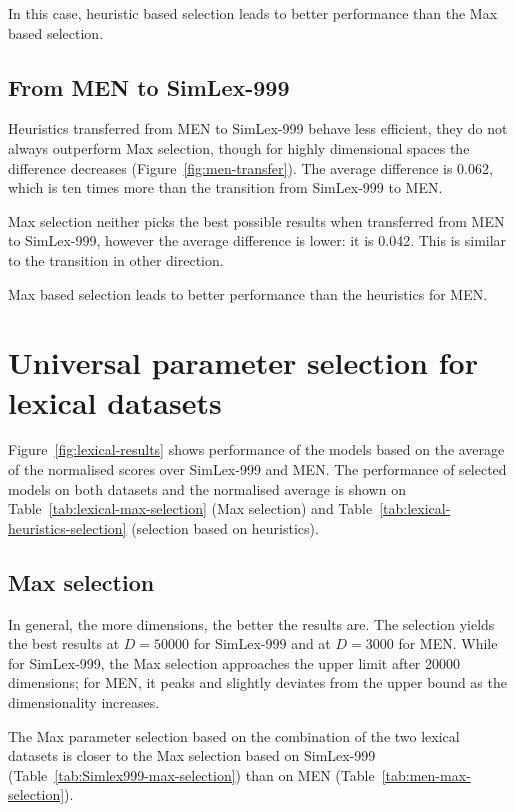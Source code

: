 In this case, heuristic based selection leads to better performance than the Max based selection.

\subsection{From MEN to SimLex-999}

Heuristics transferred from MEN to SimLex-999 behave less efficient, they do not always outperform Max selection, though for highly dimensional spaces the difference decreases (Figure~\ref{fig:men-transfer}). The average difference is 0.062, which is ten times more than the transition from SimLex-999 to MEN.

Max selection neither picks the best possible results when transferred from MEN to SimLex-999, however the average difference is lower: it is 0.042. This is similar to the transition in other direction.

Max based selection leads to better performance than the heuristics for MEN.

\section{Universal parameter selection for lexical datasets}
\label{sec:universal-lexical-param-selection}



Figure~\ref{fig:lexical-results} shows performance of the models based on the average of the normalised scores over SimLex-999 and MEN. The performance of selected models on both datasets and the normalised average is shown on Table~\ref{tab:lexical-max-selection} (Max selection) and Table~\ref{tab:lexical-heuristics-selection} (selection based on heuristics).
%

\subsection{Max selection}
\label{sec:max-selection}

In general, the more dimensions, the better the results are. The selection yields the best results at $D = 50000$ for SimLex-999 and at $D = 3000$ for MEN. While for SimLex-999,  the Max selection approaches the upper limit after 20000 dimensions; for MEN, it peaks and slightly deviates from the upper bound as the dimensionality increases.

The Max parameter selection based on the combination of the two lexical datasets is closer to the Max selection based on SimLex-999 (Table~\ref{tab:Simlex999-max-selection}) than on MEN (Table~\ref{tab:men-max-selection}).

